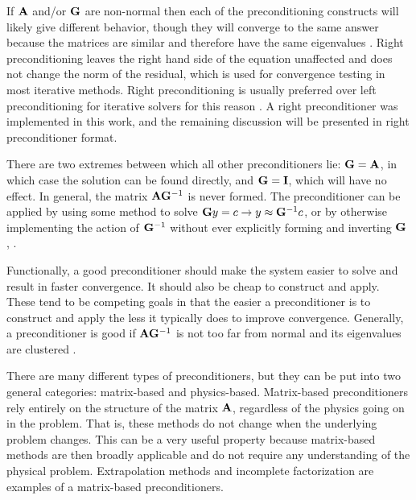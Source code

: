 If $\mathbf{A}$ and/or $\mathbf{G}$ are non-normal then each of the preconditioning constructs will likely give different behavior, though they will converge to the same answer because the matrices are similar and therefore have the same eigenvalues  \cite{Benzi2002}. Right preconditioning leaves the right hand side of the equation unaffected and does not change the norm of the residual, which is used for convergence testing in most iterative methods. Right preconditioning is usually preferred over left preconditioning for iterative solvers for this reason \cite{Knoll2004}. A right preconditioner was implemented in this work, and the remaining discussion will be presented in right preconditioner format. 

There are two extremes between which all other preconditioners lie: $\mathbf{G} = \mathbf{A}$, in which case the solution can be found directly, and $\mathbf{G} = \mathbf{I}$, which will have no effect.  In general, the matrix $\mathbf{A}\mathbf{G}^{-1}$ is never formed. The preconditioner can be applied by using some method to solve $\mathbf{G}y=c \to y \approx \mathbf{G}^{-1}c$, or by otherwise implementing the action of $\mathbf{G}^{-1}$ without ever explicitly forming and inverting $\mathbf{G}$ \cite{Benzi2002}, \cite{Trefethen1997}. 


Functionally, a good preconditioner should make the system easier to solve and result in faster convergence. It should also be cheap to construct and apply. These tend to be competing goals in that the easier a preconditioner is to construct and apply the less it typically does to improve convergence. Generally, a preconditioner is good if $\mathbf{A}\mathbf{G}^{-1}$ is not too far from normal and its eigenvalues are clustered \cite{Trefethen1997}. 

There are many different types of preconditioners, but they can be put into two general categories: matrix-based and physics-based. Matrix-based preconditioners rely entirely on the structure of the matrix $\mathbf{A}$, regardless of the physics going on in the problem. That is, these methods do not change when the underlying problem changes. This can be a very useful property because matrix-based methods are then broadly applicable and do not require any understanding of the physical problem. Extrapolation methods and incomplete factorization are examples of a matrix-based preconditioners.

